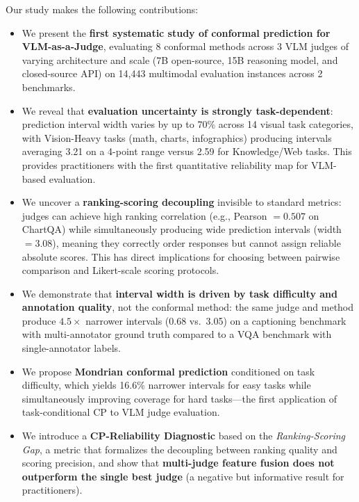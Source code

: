 \documentclass{article}
\begin{document}
Our study makes the following contributions:

\begin{itemize}[leftmargin=*,itemsep=2pt,topsep=2pt]
\item We present the \textbf{first systematic study of conformal prediction for VLM-as-a-Judge}, evaluating 8 conformal methods across 3 VLM judges of varying architecture and scale (7B open-source, 15B reasoning model, and closed-source API) on 14,443 multimodal evaluation instances across 2 benchmarks.

\item We reveal that \textbf{evaluation uncertainty is strongly task-dependent}: prediction interval width varies by up to 70\% across 14 visual task categories, with Vision-Heavy tasks (math, charts, infographics) producing intervals averaging 3.21 on a 4-point range versus 2.59 for Knowledge/Web tasks. This provides practitioners with the first quantitative reliability map for VLM-based evaluation.

\item We uncover a \textbf{ranking-scoring decoupling} invisible to standard metrics: judges can achieve high ranking correlation (e.g., Pearson $= 0.507$ on ChartQA) while simultaneously producing wide prediction intervals (width $= 3.08$), meaning they correctly order responses but cannot assign reliable absolute scores. This has direct implications for choosing between pairwise comparison and Likert-scale scoring protocols.

\item We demonstrate that \textbf{interval width is driven by task difficulty and annotation quality}, not the conformal method: the same judge and method produce $4.5\times$ narrower intervals (0.68 vs.\ 3.05) on a captioning benchmark with multi-annotator ground truth compared to a VQA benchmark with single-annotator labels.

\item We propose \textbf{Mondrian conformal prediction} conditioned on task difficulty, which yields 16.6\% narrower intervals for easy tasks while simultaneously improving coverage for hard tasks---the first application of task-conditional CP to VLM judge evaluation.

\item We introduce a \textbf{CP-Reliability Diagnostic} based on the \emph{Ranking-Scoring Gap}, a metric that formalizes the decoupling between ranking quality and scoring precision, and show that \textbf{multi-judge feature fusion does not outperform the single best judge} (a negative but informative result for practitioners).
\end{itemize}
\end{document}
